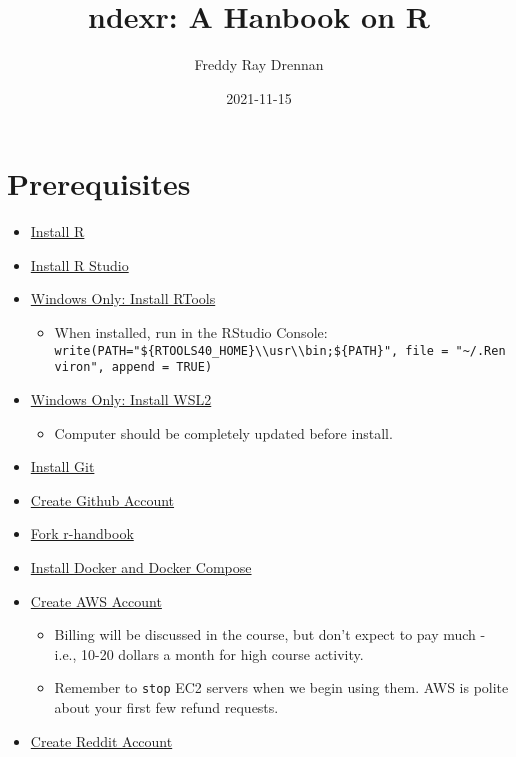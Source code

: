 \documentclass[
]{book}
\title{ndexr: A Hanbook on R}
\author{Freddy Ray Drennan}
\date{2021-11-15}
\providecommand{\tightlist}{%
  \setlength{\itemsep}{0pt}\setlength{\parskip}{0pt}}
\begin{document}
\maketitle

{
\setcounter{tocdepth}{1}
\tableofcontents
}
\hypertarget{prerequisites}{%
\chapter{Prerequisites}\label{prerequisites}}

\begin{itemize}
\tightlist
\item
  \href{https://cran.r-project.org/}{Install R}
\item
  \href{https://www.rstudio.com/products/rstudio/download/}{Install R Studio}
\item
  \href{https://cran.r-project.org/bin/windows/Rtools/}{Windows Only: Install RTools}

  \begin{itemize}
  \tightlist
  \item
    When installed, run in the RStudio Console: \texttt{write(\textquotesingle{}PATH="\$\{RTOOLS40\_HOME\}\textbackslash{}\textbackslash{}usr\textbackslash{}\textbackslash{}bin;\$\{PATH\}"\textquotesingle{},\ file\ =\ "\textasciitilde{}/.Renviron",\ append\ =\ TRUE)}
  \end{itemize}
\item
  \href{https://www.omgubuntu.co.uk/how-to-install-wsl2-on-windows-10}{Windows Only: Install WSL2}

  \begin{itemize}
  \tightlist
  \item
    Computer should be completely updated before install.
  \end{itemize}
\item
  \href{https://git-scm.com/downloads}{Install Git}
\item
  \href{https://github.com/}{Create Github Account}
\item
  \href{https://github.com/fdrennan/r-handbook}{Fork r-handbook}
\item
  \href{https://docs.docker.com/get-docker/}{Install Docker and Docker Compose}
\item
  \href{https://aws.amazon.com/}{Create AWS Account}

  \begin{itemize}
  \tightlist
  \item
    Billing will be discussed in the course, but don't expect to pay much - i.e., 10-20 dollars a month for high course activity.
  \item
    Remember to \texttt{stop} EC2 servers when we begin using them. AWS is polite about your first few refund requests.
  \end{itemize}
\item
  \href{reddit.com}{Create Reddit Account}


\end{itemize}
\end{document}
